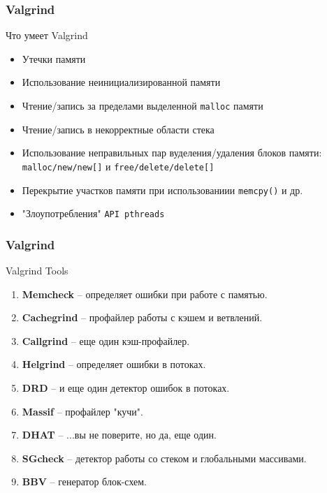 
\begin{frame}
	\frametitle{Valgrind}

	\begin{block}{Что умеет Valgrind}
		\begin{itemize}
			\item Утечки памяти
			\item Использование неинициализированной памяти
			\item Чтение/запись за пределами выделенной {\tt malloc} памяти
			\item Чтение/запись в некорректные области стека
			\item Использование неправильных пар вуделения/удаления блоков памяти:\\
				{\tt malloc/new/new[]} и {\tt free/delete/delete[]}
			\item Перекрытие участков памяти при использованиии {\tt memcpy()} и др.
			\item "Злоупотребления" {\tt API pthreads}
		\end{itemize}
	\end{block}
\end{frame}

\begin{frame}
	\frametitle{Valgrind}

	\begin{block}{Valgrind Tools}
		\begin{enumerate}
			\item {\bf Memcheck} -- определяет ошибки при работе с памятью.
			\item {\bf Cachegrind} -- профайлер работы с кэшем и ветвлений.
			\item {\bf Callgrind} -- еще один кэш-профайлер.
			\item {\bf Helgrind} -- определяет ошибки в потоках.
			\item {\bf DRD} -- и еще один детектор ошибок в потоках.
			\item {\bf Massif} -- профайлер "кучи".
			\item {\bf DHAT} -- ...вы не поверите, но да, еще один.
			\item {\bf SGcheck} -- детектор работы со стеком и глобальными массивами.
			\item {\bf BBV} -- генератор блок-схем.
		\end{enumerate}
	\end{block}
\end{frame}
			
